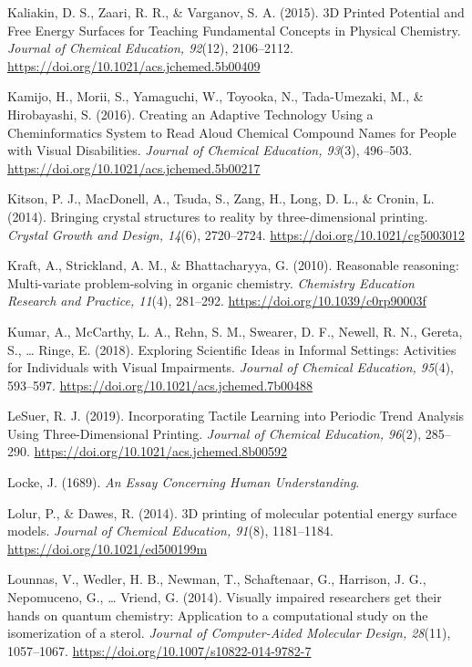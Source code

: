 \documentclass[11.5pt]{sig-alternate} %
\begin{document}
Kaliakin, D. S., Zaari, R. R., \& Varganov, S. A. (2015). 3D Printed Potential and Free Energy Surfaces for Teaching Fundamental Concepts in Physical Chemistry. \textit{Journal of Chemical Education, 92}(12), 2106–2112. \url{https://doi.org/10.1021/acs.jchemed.5b00409}

Kamijo, H., Morii, S., Yamaguchi, W., Toyooka, N., Tada-Umezaki, M., \& Hirobayashi, S. (2016). Creating an Adaptive Technology Using a Cheminformatics System to Read Aloud Chemical Compound Names for People with Visual Disabilities. \textit{Journal of Chemical Education, 93}(3), 496–503. \url{https://doi.org/10.1021/acs.jchemed.5b00217}

Kitson, P. J., MacDonell, A., Tsuda, S., Zang, H., Long, D. L., \& Cronin, L. (2014). Bringing crystal structures to reality by three-dimensional printing. \textit{Crystal Growth and Design, 14}(6), 2720–2724. \url{https://doi.org/10.1021/cg5003012}

Kraft, A., Strickland, A. M., \& Bhattacharyya, G. (2010). Reasonable reasoning: Multi-variate problem-solving in organic chemistry. \textit{Chemistry Education Research and Practice, 11}(4), 281–292. \url{https://doi.org/10.1039/c0rp90003f}

Kumar, A., McCarthy, L. A., Rehn, S. M., Swearer, D. F., Newell, R. N., Gereta, S., … Ringe, E. (2018). Exploring Scientific Ideas in Informal Settings: Activities for Individuals with Visual Impairments. \textit{Journal of Chemical Education, 95}(4), 593–597. \url{https://doi.org/10.1021/acs.jchemed.7b00488}

LeSuer, R. J. (2019). Incorporating Tactile Learning into Periodic Trend Analysis Using Three-Dimensional Printing. \textit{Journal of Chemical Education, 96}(2), 285–290. \url{https://doi.org/10.1021/acs.jchemed.8b00592}

Locke, J. (1689). \textit{An Essay Concerning Human Understanding}.

Lolur, P., \& Dawes, R. (2014). 3D printing of molecular potential energy surface models. \textit{Journal of Chemical Education, 91}(8), 1181–1184. \url{https://doi.org/10.1021/ed500199m}

Lounnas, V., Wedler, H. B., Newman, T., Schaftenaar, G., Harrison, J. G., Nepomuceno, G., … Vriend, G. (2014). Visually impaired researchers get their hands on quantum chemistry: Application to a computational study on the isomerization of a sterol. \textit{Journal of Computer-Aided Molecular Design, 28}(11), 1057–1067. \url{https://doi.org/10.1007/s10822-014-9782-7}
\end{document}
